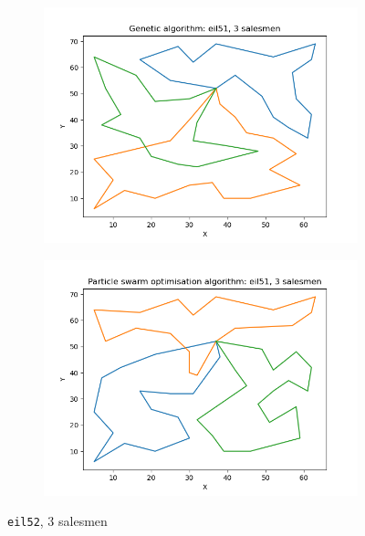 \documentclass[conference]{IEEEtran}
\begin{document}
\begin{figure}[h]
    \centering
    \begin{subfigure}{.5\textwidth}
      \centering
      \includegraphics[width=\textwidth]{images/Genetic algorithm: eil51, 3 salesmen.png}
    \end{subfigure}%
    \begin{subfigure}{.5\textwidth}
      \centering
      \includegraphics[width=\textwidth]{images/Particle swarm optimisation algorithm: eil51, 3 salesmen.png}
    \end{subfigure}%
    \caption{\texttt{eil52}, 3 salesmen} \label{eil52, 3 salesmen}
\end{figure}
\end{document}
